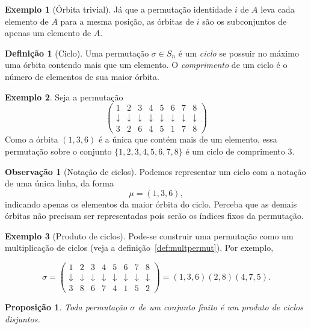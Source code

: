 \documentclass[a4paper,12pt]{report}
\theoremstyle{plain}
\newtheorem{proposicao}{Proposição}[section]
\theoremstyle{definition}
\newtheorem{definicao}{Definição}[section]
\newtheorem{observacao}{Observação}[section]
\newtheorem{exemplo}{Exemplo}[section]
\begin{document}
\begin{exemplo}[Órbita trivial]
	Já que a permutação identidade $i$ de $A$ leva cada elemento de $A$ para a mesma posição, as órbitas de $i$ são os subconjuntos de apenas um elemento de $A$.
\end{exemplo}

\begin{definicao}[Ciclo]
	Uma permutação $\sigma\in S_n$ é um \emph{ciclo} se possuir no máximo uma órbita contendo mais que um elemento. O \emph{comprimento} de um ciclo é o número de elementos de sua maior órbita.
\end{definicao}

\begin{exemplo}
	Seja a permutação 
	$$
	\begin{pmatrix}
		1 & 2 & 3 & 4 & 5 & 6 & 7 & 8\\
		\downarrow & \downarrow & \downarrow & \downarrow & \downarrow & \downarrow & \downarrow & \downarrow\\
		3 & 2 & 6 & 4 & 5 & 1 & 7 & 8
	\end{pmatrix}
	$$
	Como a órbita $(1,3,6)$ é a única que contém mais de um elemento, essa permutação sobre o conjunto $\{1,2,3,4,5,6,7,8\}$ é um ciclo de comprimento 3.
\end{exemplo}

\begin{observacao}[Notação de ciclos]
	Podemos representar um ciclo com a notação de uma única linha, da forma $$\mu = (1,3,6),$$ indicando apenas os elementos da maior órbita do ciclo. Perceba que as demais órbitas não precisam ser representadas pois serão os índices fixos da permutação.
\end{observacao}

\begin{exemplo}[Produto de ciclos]
	Pode-se construir uma permutação como um multiplicação de ciclos (veja a definição~\ref{def:multpermut}). Por exemplo,
	
	$$
	\sigma = 
	\begin{pmatrix}
		1 & 2 & 3 & 4 & 5 & 6 & 7 & 8\\
		\downarrow & \downarrow & \downarrow & \downarrow & \downarrow & \downarrow & \downarrow & \downarrow\\
		3 & 8 & 6 & 7 & 4 & 1 & 5 & 2
	\end{pmatrix}
	= (1,3,6)(2,8)(4,7,5).
	$$
\end{exemplo}

\begin{proposicao}
	Toda permutação $\sigma$ de um conjunto finito é um produto de ciclos disjuntos.
\end{proposicao}
\end{document}
